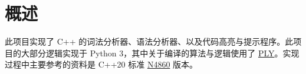 \section{概述}

此项目实现了 C++ 的词法分析器、语法分析器、以及代码高亮与提示程序。此项目的大部分逻辑实现于 Python 3，其中关于编译的算法与逻辑使用了 \href{https://github.com/dabeaz/ply}{PLY}。实现过程中主要参考的资料是 C++20 标准 \href{https://isocpp.org/files/papers/N4860.pdf}{N4860} 版本。